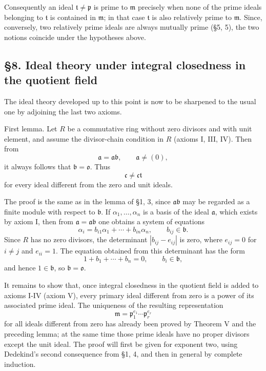 \documentclass[11pt]{article}
\begin{document}
Consequently an ideal \(\mathfrak t\ne\mathfrak p\) is prime to
\(\mathfrak m\) precisely when none of the prime ideals belonging to
\(\mathfrak t\) is contained in \(\mathfrak m\); in that case
\(\mathfrak t\) is also relatively prime to \(\mathfrak m\). Since,
conversely, two relatively prime ideals are always mutually prime (§5,
5), the two notions coincide under the hypotheses above.

\subsection{§8. Ideal theory under integral closedness in the quotient
field}\label{ideal-theory-under-integral-closedness-in-the-quotient-field}

The ideal theory developed up to this point is now to be sharpened to
the usual one by adjoining the last two axioms.

First lemma. Let \(R\) be a commutative ring without zero divisors and
with unit element, and assume the divisor-chain condition in \(R\)
(axioms I, III, IV). Then from \[
  \mathfrak a=\mathfrak a\mathfrak b,
  \qquad \mathfrak a\ne(0),
\] it always follows that \(\mathfrak b=\mathfrak o\). Thus \[
  \mathfrak c\ne\mathfrak c\mathfrak t
\] for every ideal different from the zero and unit ideals.

The proof is the same as in the lemma of §1, 3, since
\(\mathfrak a\mathfrak b\) may be regarded as a finite module with
respect to \(\mathfrak b\). If \(\alpha_1,\ldots,\alpha_n\) is a basis
of the ideal \(\mathfrak a\), which exists by axiom I, then from
\(\mathfrak a=\mathfrak a\mathfrak b\) one obtains a system of equations
\[
  \alpha_i=b_{i1}\alpha_1+\cdots+b_{in}\alpha_n,
  \qquad b_{ij}\in\mathfrak b.
\] Since \(R\) has no zero divisors, the determinant \(|b_{ij}-e_{ij}|\)
is zero, where \(e_{ij}=0\) for \(i\ne j\) and \(e_{ii}=1\). The
equation obtained from this determinant has the form \[
  1+b_1+\cdots+b_n=0,
  \qquad b_i\in\mathfrak b,
\] and hence \(1\in\mathfrak b\), so \(\mathfrak b=\mathfrak o\).

It remains to show that, once integral closedness in the quotient field
is added to axioms I-IV (axiom V), every primary ideal different from
zero is a power of its associated prime ideal. The uniqueness of the
resulting representation \[
  \mathfrak m=\mathfrak p_1^{e_1}\cdots\mathfrak p_r^{e_r}
\] for all ideals different from zero has already been proved by Theorem
V and the preceding lemma; at the same time those prime ideals have no
proper divisors except the unit ideal. The proof will first be given for
exponent two, using Dedekind's second consequence from §1, 4, and then
in general by complete induction.
\end{document}
